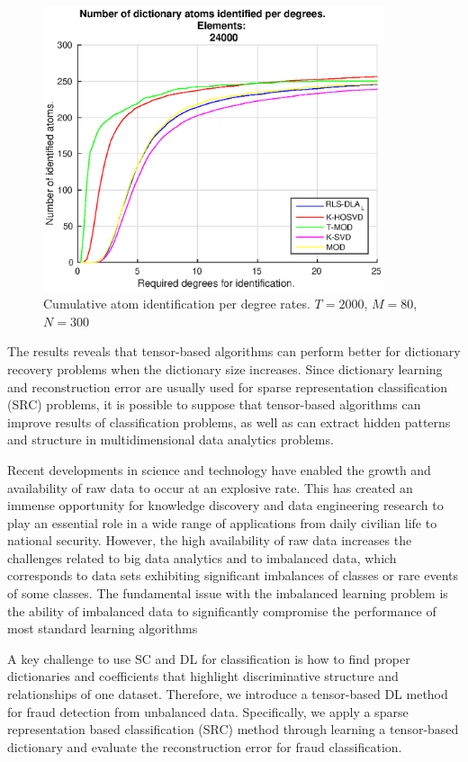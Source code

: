 \begin{figure}[!htb]
	\centering 
	\includegraphics[width=10cm]{figures/5_20_2000_24000_100.eps}
	\caption{Cumulative atom identification per degree rates. $T=2000$, $M=80$, $N=300$}
	\label{fig:fig2}
\end{figure}

The results reveals that tensor-based algorithms can perform better for dictionary recovery problems when the dictionary size increases. Since dictionary learning and reconstruction error are usually used for sparse representation classification (SRC) problems, it is possible to suppose that tensor-based algorithms can improve results of classification problems, as well as can extract hidden patterns and structure in multidimensional data analytics problems.

Recent developments in science and technology have enabled the growth and availability of raw data to occur at an explosive rate. This has created an immense opportunity for knowledge discovery and data engineering research to play an essential role in a wide range of applications from daily civilian life to national security. However, the high availability of raw data increases the challenges related to big data analytics and to imbalanced data, which corresponds to data sets exhibiting significant imbalances of classes or rare events of some classes. The fundamental issue with the imbalanced learning problem is the ability of imbalanced data to significantly compromise the performance of most standard learning algorithms

A key challenge to use SC and DL for classification is how to find proper dictionaries and coefficients that highlight discriminative structure and relationships of one dataset. Therefore, we introduce a tensor-based DL method for fraud detection from unbalanced data. Specifically, we apply a sparse representation based classification (SRC) method through learning a tensor-based dictionary and evaluate the reconstruction error for fraud classification. 

